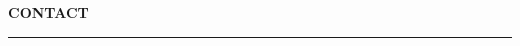 \vspace{0pt}
{\LARGE\bfseries\raggedright \Name\par}

\vspace{0.2cm}
{\normalsize \Title}

\vspace{0.35cm}
{\small\bfseries\MakeUppercase{Contact}}\\[-0.1cm]%
\rule{\linewidth}{0.4pt}%
\vspace{0.15cm}

{\small
\Address\\[4pt]
\Phone\\[4pt]
\Email
}
